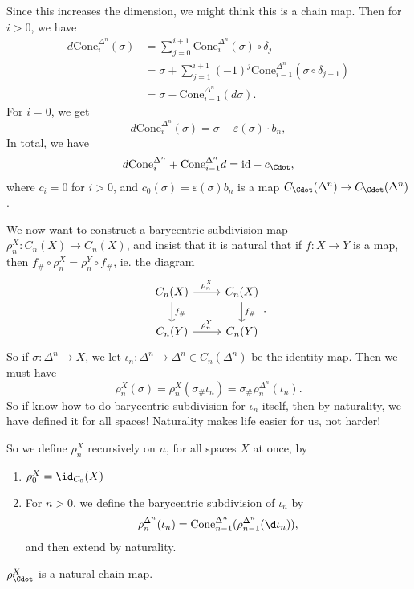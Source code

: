 \documentclass[a4paper]{article}
\begin{document}
\begin{defi}
  Since this increases the dimension, we might think this is a chain map. Then for $i > 0$, we have
  \begin{align*}
    d \mathrm{Cone}_i^{\Delta^n}(\sigma) &= \sum_{j = 0}^{i + 1} \mathrm{Cone}_i^{\Delta^n}(\sigma) \circ \delta_j \\
    &= \sigma + \sum_{j = 1}^{i + 1} (-1)^j \mathrm{Cone}_{i - 1}^{\Delta^n} (\sigma \circ \delta_{j - 1})\\
    &= \sigma - \mathrm{Cone}_{i - 1}^{\Delta^n} (d \sigma).
  \end{align*}
  For $i = 0$, we get
  \[
    d \mathrm{Cone}_i^{\Delta^n}(\sigma) = \sigma - \varepsilon(\sigma) \cdot b_n,
  \]
  In total, we have
  \[
    d \mathrm{Cone}_i^{\Delta^n} + \mathrm{Cone}_{i - 1}^{\Delta^n} d = \mathrm{id} - c_{\Cdot},
  \]
  where $c_i = 0$ for $i > 0$, and $c_0(\sigma) = \varepsilon(\sigma) b_n$ is a map $C_\Cdot(\Delta^n) \to C_\Cdot(\Delta^n)$.

  We now want to construct a barycentric subdivision map $\rho_n^X: C_n(X) \to C_n(X)$, and insist that it is natural that if $f: X \to Y$ is a map, then $f_\# \circ \rho_n^X = \rho_n^Y \circ f_\#$, ie. the diagram
  \[
    \begin{tikzcd}
      C_n(X) \ar[r, "\rho_n^X"] \ar[d, "f_\#"] & C_n(X) \ar[d, "f_\#"]\\
      C_n(Y) \ar[r, "\rho_n^Y"] & C_n(Y)
    \end{tikzcd}.
  \]
  So if $\sigma: \Delta^n \to X$, we let $\iota_n: \Delta^n \to \Delta^n \in C_n(\Delta^n)$ be the identity map. Then we must have
  \[
    \rho_n^X (\sigma) = \rho_n^X (\sigma_\# \iota_n) = \sigma_\# \rho_n^{\Delta^n}(\iota_n).
  \]
  So if know how to do barycentric subdivision for $\iota_n$ itself, then by naturality, we have defined it for all spaces! Naturality makes life easier for us, not harder!

  So we define $\rho_n^X$ recursively on $n$, for all spaces $X$ at once, by
  \begin{enumerate}
    \item $\rho_0^X = \id_{C_0}(X)$
    \item For $n > 0$, we define the barycentric subdivision of $\iota_n$ by
      \[
        \rho_n^{\Delta^n}(\iota_n) = \mathrm{Cone}_{n - 1}^{\Delta^n} (\rho_{n - 1}^{\Delta^n} (\d \iota_n)),
      \]
      and then extend by naturality.
  \end{enumerate}
\end{defi}

\begin{lemma}
  $\rho_\Cdot^X$ is a natural chain map.
\end{lemma}
\end{document}

